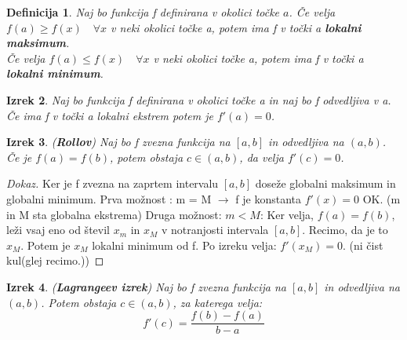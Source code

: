 \documentclass[11pt]{article}
\newtheorem{Izrek}{{\sc Izrek}}[section]
\newtheorem{Definicija}[Izrek]{{\sc Definicija}}
\newenvironment{dokaz}[1][{\sc Dokaz}]{\begin{proof}[#1]\renewcommand*{\qedsymbol}{\(\blacksquare\)}}{\end{proof}}
\begin{document}
\begin{Definicija}
	Naj bo funkcija f definirana v okolici točke $a$. Če velja $f(a) \ge f(x) \quad \forall x$ v neki okolici točke a, potem ima f v točki a \textbf{lokalni maksimum}.
	\\
	Če velja $f(a) \le f(x) \quad \forall x$ v neki okolici točke a, potem ima f v točki a \textbf{lokalni minimum}.
\end{Definicija}
\begin{Izrek}
	Naj bo funkcija f definirana v okolici točke a in naj bo f odvedljiva v a. Če ima f v točki a lokalni ekstrem potem je $f'(a) = 0$.
\end{Izrek}
\begin{Izrek}
	(\textbf{Rollov}) Naj bo f zvezna funkcija na $[a,b]$ in odvedljiva na $(a,b)$. Če je $f(a) = f(b)$, potem obstaja $c\in (a,b)$, da velja $f'(c) = 0$.
\end{Izrek}
\begin{dokaz}
	Ker je f zvezna na zaprtem intervalu $[a,b]$ doseže globalni maksimum in globalni minimum. 
	\newline
	Prva možnost : m = M $\to$ f je konstanta $f'(x) = 0$ OK. (m in M sta globalna ekstrema)
	\newline
	Druga možnost: $ m < M$:
		Ker velja, $f(a) = f(b)$, leži vsaj eno od števil $x_m$ in $x_M$ v notranjosti intervala $[a,b]$. Recimo, da je to $x_M$. Potem je $x_M$ lokalni minimum od f. Po izreku velja: $f'(x_M) = 0$.
		(ni čist kul(glej recimo.))
\end{dokaz}
\begin{Izrek}
	(\textbf{Lagrangeev izrek}) Naj bo f zvezna funkcija na $[a,b]$ in odvedljiva na $(a,b)$. Potem obstaja $c\in (a,b)$, za katerega velja:
	$$f'(c) = \frac{f(b)- f(a)}{b -a}$$
\end{Izrek}
\end{document}
